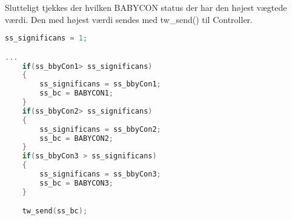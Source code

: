 Slutteligt tjekkes der hvilken BABYCON status der har den højest vægtede værdi. Den med højest værdi sendes med tw\_send() til Controller. 
\begin{lstlisting}[language=C,numbers=none]
ss_significans = 1;

...
    if(ss_bbyCon1> ss_significans)
    {
        ss_significans = ss_bbyCon1;
        ss_bc = BABYCON1;
    }
    if(ss_bbyCon2> ss_significans)
    {
        ss_significans = ss_bbyCon2;
        ss_bc = BABYCON2;
    }
    if(ss_bbyCon3 > ss_significans)
    {
        ss_significans = ss_bbyCon3;
        ss_bc = BABYCON3;
    }

    tw_send(ss_bc);
\end{lstlisting}